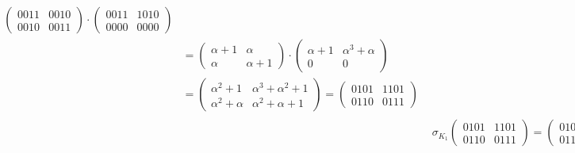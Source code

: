 \documentclass[fleqn]{article}
\begin{document}
\begin{equation*}
\begin{aligned}
\begin{aligned}
\begin{pmatrix}
                    0011 & 0010 \\
                    0010 & 0011
                \end{pmatrix} \cdot
                \begin{pmatrix}
                    0011 & 1010 \\
                    0000 & 0000
                \end{pmatrix} \\ &= 
                 \begin{pmatrix}
                    \alpha + 1 & \alpha \\
                    \alpha & \alpha + 1
                 \end{pmatrix} \cdot
                    \begin{pmatrix}
                        \alpha + 1 & \alpha^3 + \alpha \\
                        0 & 0
                    \end{pmatrix} \\ &=
                    \begin{pmatrix}
                        \alpha^2 + 1 & \alpha^3 + \alpha^2 + 1 \\
                        \alpha^2 + \alpha & \alpha^2 + \alpha + 1
                    \end{pmatrix} = 
                    \begin{pmatrix}
                        0101 & 1101 \\
                        0110 & 0111
                    \end{pmatrix}
            \end{aligned} \\
            &\sigma_{K_1} \begin{pmatrix}
                0101 & 1101 \\
                0110 & 0111
            \end{pmatrix} =
            \begin{pmatrix}
                0101 & 1101 \\
                0110 & 0111
            \end{pmatrix} +
            \begin{pmatrix}
                0011 & 1110 \\
                0110 & 1011
            \end{pmatrix} =
            \begin{pmatrix}
                0110 & 0011 \\

\end{pmatrix}
\end{aligned}
\end{equation*}
\end{document}
